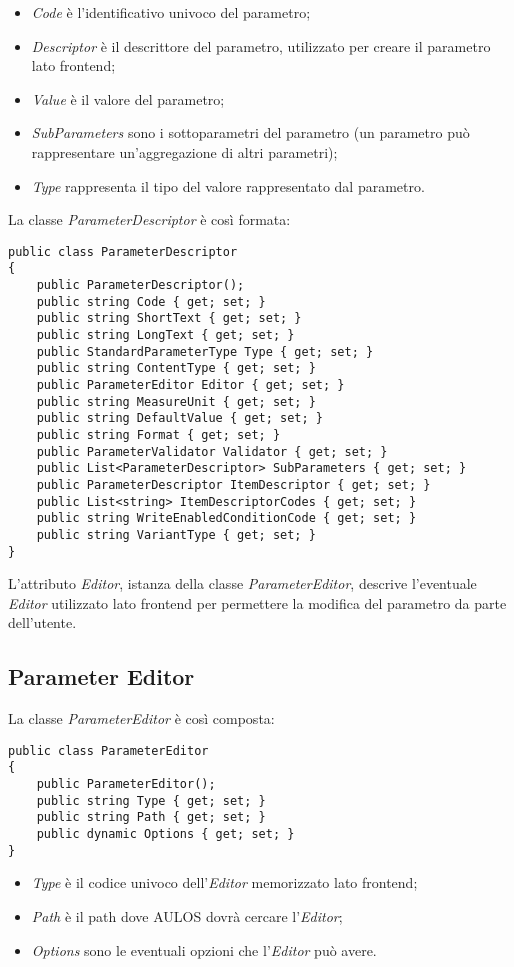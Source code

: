 \begin{itemize}
\item \textit{Code} è l'identificativo univoco del parametro;
\item \textit{Descriptor} è il descrittore del parametro, utilizzato per creare il parametro lato frontend;
\item \textit{Value} è il valore del parametro;
\item \textit{SubParameters} sono i sottoparametri del parametro (un parametro può rappresentare un'aggregazione di altri parametri);
\item \textit{Type} rappresenta il tipo del valore rappresentato dal parametro.
\end{itemize}
La classe \textit{ParameterDescriptor} è così formata:
\begin{lstlisting}[caption={ParameterDescriptor.cs},style=sharpCode]
public class ParameterDescriptor
{
    public ParameterDescriptor();        
    public string Code { get; set; }
    public string ShortText { get; set; }
    public string LongText { get; set; }
    public StandardParameterType Type { get; set; }
    public string ContentType { get; set; }
    public ParameterEditor Editor { get; set; }
    public string MeasureUnit { get; set; }
    public string DefaultValue { get; set; }
    public string Format { get; set; }
    public ParameterValidator Validator { get; set; }
    public List<ParameterDescriptor> SubParameters { get; set; }
    public ParameterDescriptor ItemDescriptor { get; set; }
    public List<string> ItemDescriptorCodes { get; set; }
    public string WriteEnabledConditionCode { get; set; }
    public string VariantType { get; set; }
}
\end{lstlisting}
L'attributo \textit{Editor}, istanza della classe \textit{ParameterEditor}, descrive l'eventuale \textit{Editor} utilizzato lato frontend per permettere la modifica del parametro da parte dell'utente.

\subsection{Parameter Editor}
La classe \textit{ParameterEditor} è così composta:
\begin{lstlisting}[caption={ParameterEditor.cs},style=sharpCode]
public class ParameterEditor
{
    public ParameterEditor();
    public string Type { get; set; }
    public string Path { get; set; }
    public dynamic Options { get; set; }
}
\end{lstlisting}
\begin{itemize}
\item \textit{Type} è il codice univoco dell'\textit{Editor} memorizzato lato frontend;
\item \textit{Path} è il path dove AULOS dovrà cercare l'\textit{Editor};
\item \textit{Options} sono le eventuali opzioni che l'\textit{Editor} può avere.
\end{itemize}

